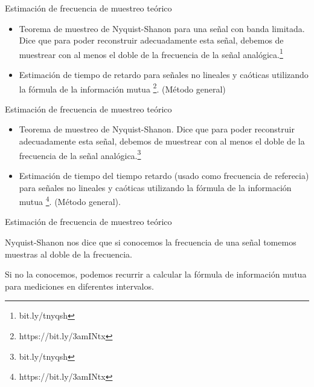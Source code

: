 \documentclass{beamer}
\theoremstyle{definition}
\begin{document}
\begin{frame}{Estimación de frecuencia de muestreo teórico}

\begin{itemize}
\item Teorema de muestreo de Nyquist-Shanon para una señal con banda limitada. Dice que para poder reconstruir adecuadamente esta señal, debemos de muestrear con al menos el doble de la frecuencia de la señal analógica.\footnote{bit.ly/tnyqsh}
\item Estimación de tiempo de retardo para señales no lineales y caóticas utilizando la fórmula de la información mutua \footnote{https://bit.ly/3amINtx}. (Método general)
\end{itemize}

\end{frame}


\begin{frame}{Estimación de frecuencia de muestreo teórico}



\begin{itemize}
\item Teorema de muestreo de Nyquist-Shanon. Dice que para poder reconstruir adecuadamente esta señal, debemos de muestrear con al menos el doble de la frecuencia de la señal analógica.\footnote{bit.ly/tnyqsh}
\item Estimación de tiempo del tiempo retardo (usado como frecuencia de referecia) para señales no lineales y caóticas utilizando la fórmula de la información mutua \footnote{https://bit.ly/3amINtx}. (Método general). \end{itemize}

\end{frame}


\begin{frame}{Estimación de frecuencia de muestreo teórico}

Nyquist-Shanon nos dice que si conocemos la frecuencia de una señal tomemos muestras al doble de la frecuencia. 

Si no la conocemos, podemos recurrir a calcular la fórmula de información mutua para mediciones en diferentes intervalos. 


\end{frame}
\end{document}
